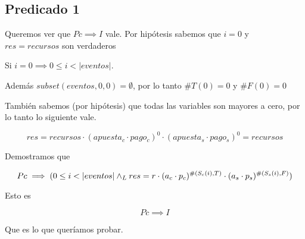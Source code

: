 \documentclass[../document.tex]{subfiles}
\begin{document}
\subsection*{Predicado 1}
Queremos ver que $Pc\implies I$ vale. Por hipótesis sabemos que $i=0$ y $res=recursos$ son verdaderos

Si $i=0 \implies 0\leq i < |eventos|$. 

Además $subset(eventos,0,0)=\emptyset$, por lo tanto $\#T(0)=0$ y $\#F(0)=0$

También sabemos (por hipótesis) que todas las variables son mayores a cero, por lo tanto lo siguiente vale.

\begin{equation*}
res=recursos\cdot(apuesta_c\cdot pago_c)^0\cdot (apuesta_s\cdot pago_s)^0=recursos
\end{equation*}

Demostramos que

\begin{equation*}
Pc\implies (0\leq i < |eventos| \land _L res=r\cdot(a_c\cdot p_c)^{\#(S_c(i),T)}\cdot(a_s\cdot p_s)^{\#(S_s(i),F)})
\end{equation*}

Esto es

\begin{equation*}
Pc\implies I
\end{equation*}

Que es lo que queríamos probar.








\end{document}
